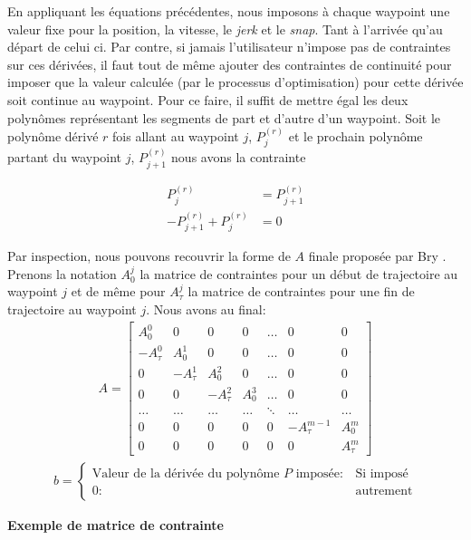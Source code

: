 En appliquant les équations précédentes, nous imposons à chaque waypoint une valeur fixe pour la position, la vitesse, le \textit{jerk} et le \textit{snap}. Tant à l'arrivée qu'au départ de celui ci. Par contre, si jamais l'utilisateur n'impose pas de contraintes sur ces dérivées, il faut tout de même ajouter des contraintes de continuité pour imposer que la valeur calculée (par le processus d'optimisation) pour cette dérivée soit continue au waypoint. Pour ce faire, il suffit de mettre égal les deux polynômes représentant les segments de part et d'autre d'un waypoint. Soit le polynôme dérivé $r$ fois allant au waypoint $j$, $P_{j}^{(r)}$ et le prochain polynôme partant du waypoint $j$, $P_{j+1}^{(r)}$ nous avons la contrainte

\begin{align*}
	P_{j}^{(r)} &= P_{j+1}^{(r)}\\
	-P_{j+1}^{(r)} + P_{j}^{(r)} &= 0
\end{align*}

Par inspection, nous pouvons recouvrir la forme de $A$ finale proposée par Bry \citep{bry2012control}. Prenons la notation $A_0^j$ la matrice de contraintes pour un début de trajectoire au waypoint $j$ et de même pour $A_\tau^j$ la matrice de contraintes pour une fin de trajectoire au waypoint $j$. Nous avons au final:
\begin{align}
A=  \begin{bmatrix}
		A_0^0	& 0	& 0 & 0 & \ldots & 0 & 0 \\
		-A_\tau^0 & A_0^1 & 0 & 0 & \ldots & 0 & 0 \\
		0 &  -A_\tau^1 & A_0^2 & 0 & \ldots & 0 & 0\\
		0 & 0 & -A_\tau^2 & A_0^3 & \ldots &0 &0 \\
		\ldots & \ldots & \ldots & \ldots & \ddots & \ldots & \ldots \\
		0& 0& 0& 0& 0& -A_\tau^{m-1} & A_0^m \\
				0& 0& 0& 0& 0& 0& A_\tau^m
	\end{bmatrix}
\end{align}
\begin{align}
b = \left\{
  \begin{array}{ll}
    \text{Valeur de la dérivée du polynôme $P$ imposée}: & \text{Si imposé} \\
    0 : & \text{autrement}
  \end{array}
\right.
\end{align}

\textbf{Exemple de matrice de contrainte}

